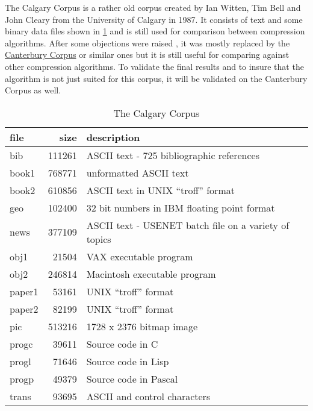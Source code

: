 \par{
The Calgary Corpus \cite{calgaryCorpus} is a rather old corpus created by Ian Witten, Tim Bell and John Cleary from the University of Calgary in 1987. It consists of text and some binary data files shown in \ref{tab:t05 The Calgary Corpus} and is still used for comparison between compression algorithms. After some objections were raised \cite{CalgaryCorpusCritic}, it was mostly replaced by the \href{http://corpus.canterbury.ac.nz/}{Canterbury Corpus} or similar ones but it is still useful for comparing against other compression algorithms. To validate the final results and to insure that the algorithm is not just suited for this corpus, it will be validated on the Canterbury Corpus as well.

\begin{table}[H]
	\centering
	\begin{tabular}{l|r|l}	
		file & size & description\\
		\hline
bib & 111261 & ASCII text - 725 bibliographic references\\
book1 & 768771 & unformatted ASCII text\\
book2 & 610856 & ASCII text in UNIX \enquote{troff} format\\
geo & 102400 & 32 bit numbers in IBM floating point format\\
news & 377109 & ASCII text - USENET batch file on a variety of topics\\
obj1 & 21504 & VAX executable program \\
obj2 & 246814 &	Macintosh executable program \\
paper1 & 53161 & UNIX \enquote{troff} format \\
paper2 & 82199 & UNIX \enquote{troff} format \\
pic & 513216 & 1728 x 2376 bitmap image\\
progc & 39611 & Source code in C \\
progl & 71646 &  Source code in Lisp\\
progp & 49379 & Source code in Pascal\\
trans & 93695 & ASCII and control characters\\	 
	\end{tabular}
	\caption{The Calgary Corpus}
	\label{tab:t05 The Calgary Corpus}
\end{table}	
}

